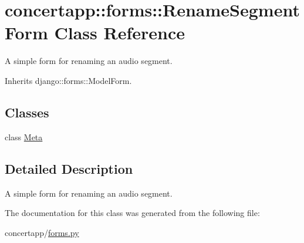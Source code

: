 \hypertarget{classconcertapp_1_1forms_1_1_rename_segment_form}{
\section{concertapp::forms::RenameSegmentForm Class Reference}
\label{classconcertapp_1_1forms_1_1_rename_segment_form}
}


A simple form for renaming an audio segment.  




Inherits django::forms::ModelForm.

\subsection*{Classes}
\begin{DoxyCompactItemize}
\item 
class \hyperlink{classconcertapp_1_1forms_1_1_rename_segment_form_1_1_meta}{Meta}
\end{DoxyCompactItemize}


\subsection{Detailed Description}
A simple form for renaming an audio segment. 

The documentation for this class was generated from the following file:\begin{DoxyCompactItemize}
\item 
concertapp/\hyperlink{forms_8py}{forms.py}\end{DoxyCompactItemize}
